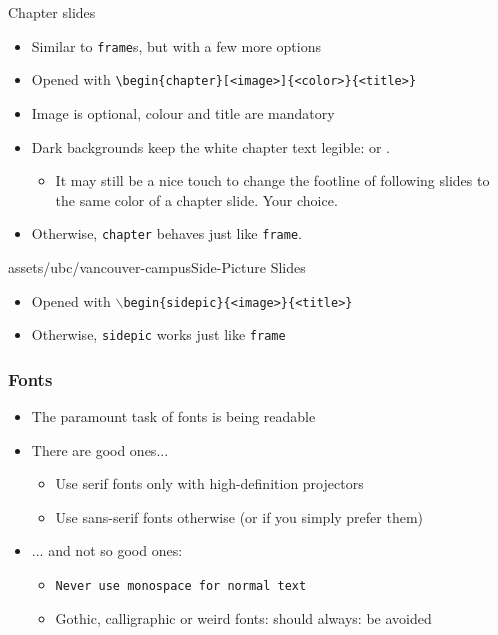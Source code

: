 \begin{frame}[fragile]{Chapter slides}
\begin{itemize}
\item Similar to \verb|frame|s, but with a few more options
\item Opened with \verb|\begin{chapter}[<image>]{<color>}{<title>}|
\item Image is optional, colour and title are mandatory
\item Dark backgrounds keep the white chapter text legible:
 or .
      \begin{itemize}
      \item It may still be a nice touch to change the footline of following 
      slides to the same color of a chapter slide. Your choice.
      \end{itemize}
\item Otherwise, \verb|chapter| behaves just like \verb|frame|.
\end{itemize}
\end{frame}

\begin{sidepic}{assets/ubc/vancouver-campus}{Side-Picture Slides}
\begin{itemize}
\item Opened with \texttt{$\backslash$begin\{sidepic\}\{<image>\}\{<title>\}}
\item Otherwise, \texttt{sidepic} works just like \texttt{frame}
\end{itemize}
\end{sidepic}

\footlinecolor{}
\begin{frame}
\frametitle{Fonts}
\begin{itemize}
\item The paramount task of fonts is being readable
\item There are good ones...
  \begin{itemize}
  \item {\textrm{Use serif fonts only with high-definition projectors}}
  \item {\textsf{Use sans-serif fonts otherwise (or if you simply prefer 
them)}}
  \end{itemize}
\item ... and not so good ones:
  \begin{itemize}
  \item {\texttt{Never use monospace for normal text}}
  \item {\frakfamily Gothic, calligraphic or weird fonts: should always: be
  avoided}
\end{itemize}
\end{itemize}
\end{frame}

